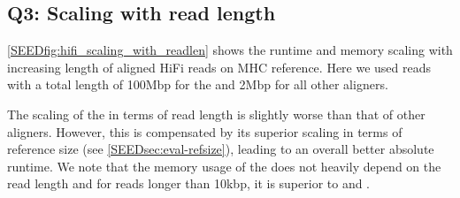 \subsection{Q3: Scaling with read length}

\cref{SEEDfig:hifi_scaling_with_readlen} shows the runtime and memory scaling with
increasing length of aligned HiFi reads on MHC reference. Here we used reads
with a total length of 100Mbp for the \seedh and 2Mbp for all other aligners.

The scaling of the \seedh in terms of read length is slightly worse than that of
other aligners. However, this is compensated by its superior scaling in terms of
reference size (see \cref{SEEDsec:eval-refsize}), leading to an overall better
absolute runtime. We note that the memory usage of the \seedh does not heavily
depend on the read length and for reads longer than 10kbp, it is superior to
\graphaligner and \vargas.


